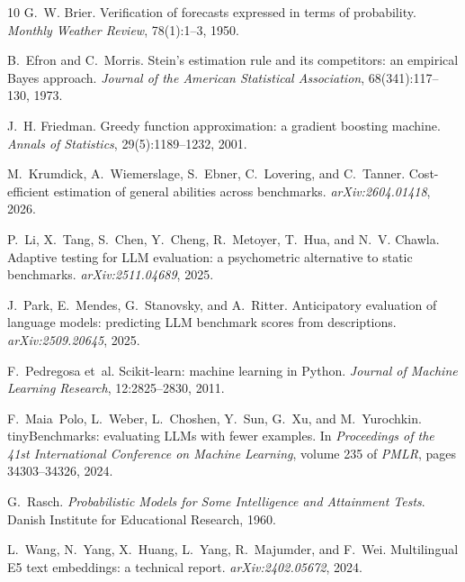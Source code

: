 \documentclass{article}
\begin{document}

\begin{thebibliography}{10}
G.~W. Brier.
\newblock Verification of forecasts expressed in terms of probability.
\newblock \emph{Monthly Weather Review}, 78(1):1--3, 1950.

B.~Efron and C.~Morris.
\newblock Stein's estimation rule and its competitors: an empirical Bayes approach.
\newblock \emph{Journal of the American Statistical Association}, 68(341):117--130, 1973.

J.~H. Friedman.
\newblock Greedy function approximation: a gradient boosting machine.
\newblock \emph{Annals of Statistics}, 29(5):1189--1232, 2001.

M.~Krumdick, A.~Wiemerslage, S.~Ebner, C.~Lovering, and C.~Tanner.
\newblock Cost-efficient estimation of general abilities across benchmarks.
\newblock \emph{arXiv:2604.01418}, 2026.

P.~Li, X.~Tang, S.~Chen, Y.~Cheng, R.~Metoyer, T.~Hua, and N.~V. Chawla.
\newblock Adaptive testing for {LLM} evaluation: a psychometric alternative to static benchmarks.
\newblock \emph{arXiv:2511.04689}, 2025.

J.~Park, E.~Mendes, G.~Stanovsky, and A.~Ritter.
\newblock Anticipatory evaluation of language models: predicting {LLM} benchmark scores from descriptions.
\newblock \emph{arXiv:2509.20645}, 2025.

F.~Pedregosa et~al.
\newblock Scikit-learn: machine learning in {Python}.
\newblock \emph{Journal of Machine Learning Research}, 12:2825--2830, 2011.

F.~Maia~Polo, L.~Weber, L.~Choshen, Y.~Sun, G.~Xu, and M.~Yurochkin.
\newblock tinyBenchmarks: evaluating {LLMs} with fewer examples.
\newblock In \emph{Proceedings of the 41st International Conference on Machine Learning}, volume 235 of \emph{PMLR}, pages 34303--34326, 2024.

G.~Rasch.
\newblock \emph{Probabilistic Models for Some Intelligence and Attainment Tests}.
\newblock Danish Institute for Educational Research, 1960.

L.~Wang, N.~Yang, X.~Huang, L.~Yang, R.~Majumder, and F.~Wei.
\newblock Multilingual E5 text embeddings: a technical report.
\newblock \emph{arXiv:2402.05672}, 2024.
\end{thebibliography}
\end{document}
